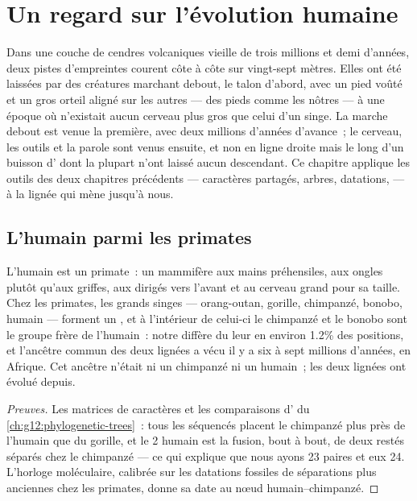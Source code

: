 \chapter{Un regard sur l'évolution humaine}\label{ch:g12:human-evolution}

Dans une couche de cendres volcaniques vieille de trois millions et
demi d'années, deux pistes d'empreintes courent côte à côte sur
vingt-sept mètres. Elles ont été laissées par des créatures marchant
debout, le talon d'abord, avec un pied voûté et un gros orteil aligné
sur les autres --- des pieds comme les nôtres --- à une époque où
n'existait aucun cerveau plus gros que celui d'un singe. La marche
debout est venue la première, avec deux millions d'années d'avance~;
le cerveau, les outils et la parole sont venus ensuite, et non en
ligne droite mais le long d'un buisson d' dont la plupart n'ont
laissé aucun descendant. Ce chapitre applique les outils des deux
chapitres précédents --- caractères partagés, arbres, datations,
 --- à la lignée qui mène jusqu'à nous.

\section{L'humain parmi les primates}

\begin{proposition}\label{prop:g12:human-evolution:place}
L'humain est un primate~: un mammifère aux mains préhensiles, aux
ongles plutôt qu'aux griffes, aux  dirigés vers l'avant et au
cerveau grand pour sa taille. Chez les primates, les grands
singes --- orang-outan, gorille, chimpanzé, bonobo, humain --- forment
un , et à l'intérieur de celui-ci le chimpanzé et le bonobo sont
le groupe frère de l'humain~: notre  diffère du leur en environ
1.2\% des positions, et l'ancêtre commun des deux lignées a vécu il y
a six à sept millions d'années, en Afrique. Cet ancêtre n'était ni un
chimpanzé ni un humain~; les deux lignées ont évolué depuis.
\end{proposition}
\begin{proof}[Preuves]
Les matrices de caractères et les comparaisons d' du
\cref{ch:g12:phylogenetic-trees}~: tous les  séquencés placent le
chimpanzé plus près de l'humain que du gorille, et le  2
humain est la fusion, bout à bout, de deux  restés séparés
chez le chimpanzé --- ce qui explique que nous ayons 23 paires et eux
24. L'horloge moléculaire, calibrée sur les datations fossiles de
séparations plus anciennes chez les primates, donne sa date au nœud
humain--chimpanzé.
\end{proof}


